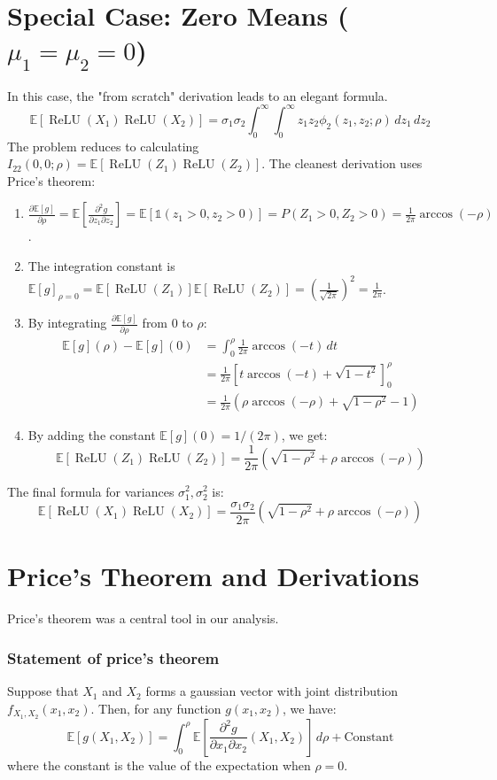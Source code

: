\documentclass[11pt, a4paper]{article}
\newcommand{\E}{\mathbb{E}}
\newcommand{\dd}{\,d} %
\DeclareMathOperator{\ReLU}{ReLU}
\newcommand{\indic}{\mathbb{1}}
\begin{document}
\section{Special Case: Zero Means ($\mu_1=\mu_2=0$)}
In this case, the "from scratch" derivation leads to an elegant formula.
\[
\E[\ReLU(X_1)\ReLU(X_2)] = \sigma_1\sigma_2 \int_0^\infty \int_0^\infty z_1 z_2 \phi_2(z_1, z_2; \rho) \dd z_1 \dd z_2
\]
The problem reduces to calculating $I_{22}(0,0; \rho) = \E[\ReLU(Z_1)\ReLU(Z_2)]$. The cleanest derivation uses Price's theorem:
\begin{enumerate}
    \item $\frac{\partial \E[g]}{\partial \rho} = \E\left[\frac{\partial^2 g}{\partial z_1 \partial z_2}\right] = \E[\indic(z_1>0, z_2>0)] = P(Z_1>0, Z_2>0) = \frac{1}{2\pi}\arccos(-\rho)$.
    \item The integration constant is $\E[g]_{\rho=0} = \E[\ReLU(Z_1)]\E[\ReLU(Z_2)] = \left(\frac{1}{\sqrt{2\pi}}\right)^2 = \frac{1}{2\pi}$.
    \item By integrating $\frac{\partial \E[g]}{\partial \rho}$ from $0$ to $\rho$:
    \begin{align*}
        \E[g](\rho) - \E[g](0) &= \int_0^\rho \frac{1}{2\pi}\arccos(-t) \dd t \\
        &= \frac{1}{2\pi} \left[ t\arccos(-t) + \sqrt{1-t^2} \right]_0^\rho \\
        &= \frac{1}{2\pi} (\rho\arccos(-\rho) + \sqrt{1-\rho^2} - 1)
    \end{align*}
    \item By adding the constant $\E[g](0) = 1/(2\pi)$, we get:
    \[
    \E[\ReLU(Z_1)\ReLU(Z_2)] = \frac{1}{2\pi}(\sqrt{1-\rho^2} + \rho\arccos(-\rho))
    \]
\end{enumerate}
The final formula for variances $\sigma_1^2, \sigma_2^2$ is:
\[
\E[\ReLU(X_1)\ReLU(X_2)] = \frac{\sigma_1\sigma_2}{2\pi}(\sqrt{1-\rho^2} + \rho\arccos(-\rho))
\]


\newpage
\section{Price's Theorem and Derivations}
Price's theorem was a central tool in our analysis.

\subsubsection*{Statement of price's theorem}
Suppose that $X_1$ and $X_2$ forms a gaussian vector with joint distribution $f_{X_1,X_2}(x_1,x_2)$. Then, for any function $g(x_1,x_2)$, we have:
\[
\E[g(X_1,X_2)] = \int_0^\rho \E\left[\frac{\partial^2 g}{\partial x_1 \partial x_2}(X_1,X_2)\right] \dd\rho + \text{Constant}
\]
where the constant is the value of the expectation when $\rho=0$.
\end{document}
